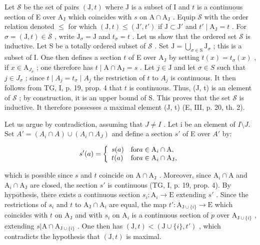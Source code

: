Let \(\mathcal{S}\) be the set of pairs \((\mathrm{J},t)\) where \(\mathrm{J}\) is a subset of I and \(t\) is a continuous section of E over \(\mathrm{A_J}\) which coincides with \(s\) on \(\mathrm{A} \cap \mathrm{A_J}\) . Equip \(\mathcal{S}\) with the order relation denoted \(\leqslant\) for which \((\mathrm{J},t) \leqslant (\mathrm{J}',t')\) if \(\mathrm{J} \subset \mathrm{J}'\) and \(t' \mid \mathrm{A_J} = t\) . For \(\sigma = (\mathrm{J},t) \in \mathcal{S}\) , write \(\mathrm{J}_{\sigma} = \mathrm{J}\) and \(t_{\sigma} = t\) . Let us show that the ordered set \(\mathcal{S}\) is inductive. Let S be a totally ordered subset of \(\mathcal{S}\) . Set \(\mathrm{J} = \bigcup_{\sigma \in \mathrm{S}} \mathrm{J}_{\sigma}\) ; this is a subset of I. One then defines a section \(t\) of E over \(\mathrm{A_J}\) by setting \(t(x) = t_{\sigma}(x)\) , if \(x \in \mathrm{A}_{J_{\sigma}}\) ; one therefore has \(t \mid \mathrm{A} \cap \mathrm{A_J} = s\) . Let \(j \in \mathrm{J}\) and let \(\sigma \in S\) such that \(j \in J_{\sigma}\) ; since \(t \mid A_j = t_{\sigma} \mid A_j\) the restriction of \(t\) to \(A_j\) is continuous. It then follows from TG, I, p. 19, prop. 4 that \(t\) is continuous. Thus, (J, t) is an element of \(\mathcal{S}\) ; by construction, it is an upper bound of S. This proves that the set \(\mathcal{S}\) is inductive. It therefore possesses a maximal element (J, t) (E, III, p. 20, th. 2).

Let us argue by contradiction, assuming that \(J \neq I\) . Let i be an element of \(I \setminus J\). Set \(A' = (A_i \cap A) \cup (A_i \cap A_J)\) and define a section \(s'\) of E over \(A'\) by:

\[
s ^ {\prime} (a) = \left\{ \begin{array}{l l} s (a) & \text {for} a \in \mathrm{A} _ {i} \cap \mathrm{A}, \\ t (a) & \text {for} a \in \mathrm{A} _ {i} \cap \mathrm{A} _ {\mathrm{J}}, \end{array} \right.
\]

which is possible since \(s\) and \(t\) coincide on \(\mathrm{A} \cap \mathrm{A}_{\mathrm{J}}\) . Moreover, since \(\mathrm{A}_{i} \cap \mathrm{A}\) and \(\mathrm{A}_{i} \cap \mathrm{A}_{\mathrm{J}}\) are closed, the section \(s'\) is continuous (TG, I, p. 19, prop. 4). By hypothesis, there exists a continuous section \(s_{i}: \mathrm{A}_{i} \to \mathrm{E}\) extending \(s'\) . Since the restrictions of \(s_{i}\) and \(t\) to \(\mathrm{A}_{\mathrm{J}} \cap \mathrm{A}_{i}\) are equal, the map \(t': \mathrm{A}_{\mathrm{J} \cup \{i\}} \to \mathrm{E}\) which coincides with \(t\) on \(\mathrm{A}_{\mathrm{J}}\) and with \(s_{i}\) on \(\mathrm{A}_{i}\) is a continuous section of \(p\) over \(\mathrm{A}_{\mathrm{J} \cup \{i\}}\) , extending \(s| \mathrm{A} \cap \mathrm{A}_{\mathrm{J} \cup \{i\}}\) . One then has \((\mathrm{J}, t) < (\mathrm{J} \cup \{i\}, t')\) , which contradicts the hypothesis that \((\mathrm{J}, t)\) is maximal.

